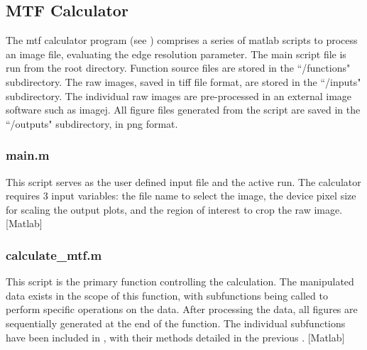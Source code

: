 \documentclass[../../../main.tex]{subfiles}
\begin{document}
%
    \subsection{MTF Calculator}%
    \label{app:image-processing:modulation-transfer-function:mtf-calculator}%
    The \gls{mtf} calculator program (see ) comprises a series of \gls{matlab} scripts to process an image file, evaluating the edge resolution parameter.
    The main script file is run from the root directory.
    Function source files are stored in the ``/functions" subdirectory.
    The raw images, saved in \gls{tiff} file format, are stored in the ``/inputs" subdirectory.
    The individual raw images are pre-processed in an external image software such as \gls{imagej}.
    All figure files generated from the script are saved in the ``/outputs" subdirectory, in \gls{png} format.
    \subsubsection{main.m}%
    This script serves as the user defined input file and the active run.
    The calculator requires 3 input variables: the file name to select the image, the device pixel size for scaling the output plots, and the region of interest to crop the raw image.%
    [Matlab]%
    \subsubsection{calculate\_mtf.m}%
    This script is the primary function controlling the calculation.
    The manipulated data exists in the scope of this function, with subfunctions being called to perform specific operations on the data.
    After processing the data, all figures are sequentially generated at the end of the function.
    The individual subfunctions have been included in , with their methods detailed in the previous .%
    [Matlab]%
\end{document}
